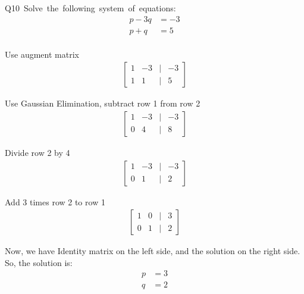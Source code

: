\documentclass[12pt]{article}
\begin{document}
Q10\ Solve\ the\ following\ system\ of\ equations: \\
\begin{align*}
p - 3q &= -3 \\
p + q &= 5 \\
\end{align*}

Use augment matrix \\
\begin{align*}
\begin{bmatrix}
    1 & -3 & | & -3 \\
    1 & 1 & | & 5
\end{bmatrix}
\end{align*}

Use Gaussian Elimination, subtract row 1 from row 2 \\
\begin{align*}
\begin{bmatrix}
    1 & -3 & | & -3 \\
    0 & 4 & | & 8
\end{bmatrix}
\end{align*}

Divide row 2 by 4 \\
\begin{align*}
\begin{bmatrix}
    1 & -3 & | & -3 \\
    0 & 1 & | & 2
\end{bmatrix}
\end{align*}

Add 3 times row 2 to row 1 \\
\begin{align*}
\begin{bmatrix}
    1 & 0 & | & 3 \\
    0 & 1 & | & 2
\end{bmatrix}
\end{align*}

Now, we have Identity matrix on the left side, and the solution on the right side. \\
So, the solution is: \\
\begin{align*}
p &= 3 \\
q &= 2
\end{align*}
\end{document}
